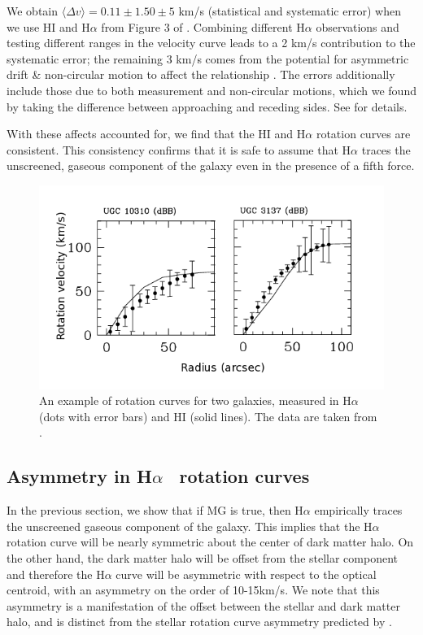 \documentclass{emulateapj}
\newcommand{\ha}{H$\alpha$}
\begin{document}
We obtain $\langle \Delta v\rangle=0.11\pm 1.50 \pm 5$ km/s (statistical and
systematic error) when we use HI and \ha{}
from Figure 3 of \citet{Swaters2009}.  Combining different \ha{} observations
and testing different ranges in the velocity curve leads to a 2 km/s
contribution to the systematic error; the remaining 3 km/s comes from the
potential for asymmetric drift \& non-circular motion to affect the
relationship \citep{Swaters2009, deblok2002}. The errors
additionally include those due to both measurement and non-circular motions,
which we found by taking the difference between approaching and receding
sides. See \citet{Swaters2009} for details. 

With these affects accounted for, we find that the HI and \ha{} rotation
curves are consistent.  This consistency confirms that it is safe to assume
that \ha{} traces the unscreened, gaseous component of the galaxy even
in the presence of a fifth force.

\begin{figure}
\begin{center}
  \includegraphics[scale=0.45]{figures/H1-HA-rot-eg.png}
\caption{An example of rotation curves for two galaxies, measured in \ha{}
(dots with error bars) and HI (solid lines).
The data are taken from \citet{Swaters2009}.}
\label{h1-ha-rot-eg}
\end{center}
\end{figure}


\subsection{Asymmetry in \ha~ rotation curves}\label{sec:asymmetry}

In the previous section, we show that if MG is true, then \ha{} empirically
traces the unscreened gaseous component of the galaxy. This implies
that the \ha{} rotation curve will be nearly symmetric about the
center of dark matter halo. On the other hand, the dark matter halo will be
offset from the stellar component and therefore the \ha{} curve will be
asymmetric with respect to the optical centroid, with an asymmetry on
the order of 10-15km/s. We note that this asymmetry is
a manifestation of the offset between the stellar and dark matter halo,
and is distinct from the stellar rotation curve asymmetry predicted by
\citet{bhuvjake2011}.
\end{document}
